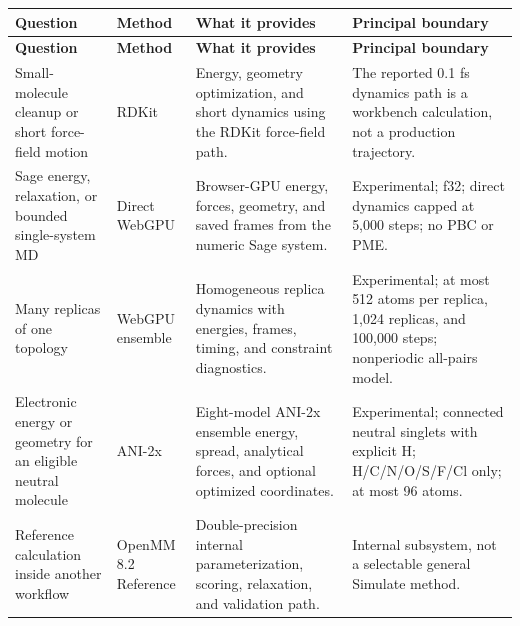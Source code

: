 \documentclass[11pt]{article}
\begin{document}
\begingroup
\footnotesize
\begin{longtable}{@{}p{1.31in}p{0.78in}p{1.77in}p{1.85in}@{}}
\toprule
\textbf{Question} & \textbf{Method} & \textbf{What it provides} & \textbf{Principal boundary}\\
\midrule
\endfirsthead
\toprule
\textbf{Question} & \textbf{Method} & \textbf{What it provides} & \textbf{Principal boundary}\\
\midrule
\endhead
Small-molecule cleanup or short force-field motion & RDKit & Energy, geometry optimization, and short dynamics using the RDKit force-field path. & The reported 0.1 fs dynamics path is a workbench calculation, not a production trajectory.\\
Sage energy, relaxation, or bounded single-system MD & Direct WebGPU & Browser-GPU energy, forces, geometry, and saved frames from the numeric Sage system. & Experimental; f32; direct dynamics capped at 5,000 steps; no PBC or PME.\\
Many replicas of one topology & WebGPU ensemble & Homogeneous replica dynamics with energies, frames, timing, and constraint diagnostics. & Experimental; at most 512 atoms per replica, 1,024 replicas, and 100,000 steps; nonperiodic all-pairs model.\\
Electronic energy or geometry for an eligible neutral molecule & ANI-2x & Eight-model ANI-2x ensemble energy, spread, analytical forces, and optional optimized coordinates. & Experimental; connected neutral singlets with explicit H; H/C/N/O/S/F/Cl only; at most 96 atoms.\\
Reference calculation inside another workflow & OpenMM 8.2 Reference & Double-precision internal parameterization, scoring, relaxation, and validation path. & Internal subsystem, not a selectable general Simulate method.\\
\bottomrule
\end{longtable}
\endgroup

\end{document}
